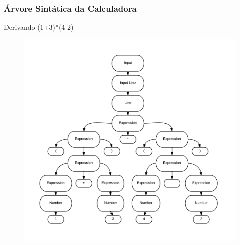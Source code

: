 \documentclass{beamer}
\begin{document}
\begin {frame}
\frametitle{Árvore Sintática da Calculadora }
Derivando (1+3)*(4-2)

\begin{figure} 	%
            \centering		%
            \includegraphics[scale=0.1]{6.png} %
            \end{figure} 

\end{frame}
\end{document}
